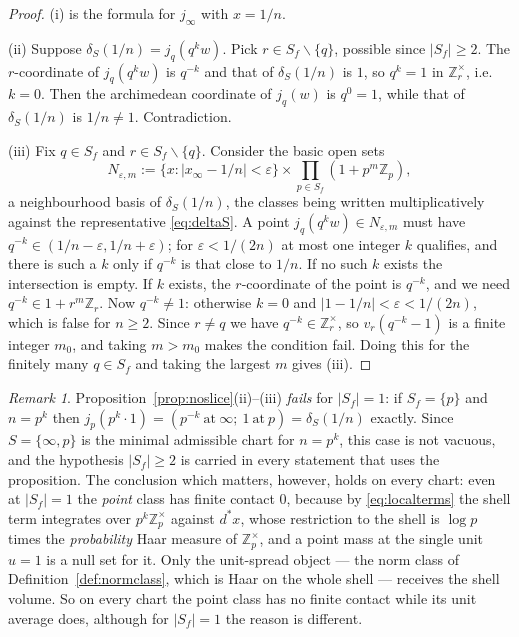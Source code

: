 \documentclass[11pt]{amsart}
\theoremstyle{definition}
\theoremstyle{remark}
\newtheorem{remark}[theorem]{Remark}
\newcommand{\Z}{\mathbb Z}
\begin{document}
\begin{proof}
(i) is the formula for $j_\infty$ with $x=1/n$.

(ii) Suppose $\delta_S(1/n)=j_q(q^kw)$. Pick $r\in S_f\smallsetminus\{q\}$,
possible since $|S_f|\ge2$. The $r$-coordinate of $j_q(q^kw)$ is $q^{-k}$ and
that of $\delta_S(1/n)$ is $1$, so $q^{k}=1$ in $\Z_r^\times$, i.e. $k=0$.
Then the archimedean coordinate of $j_q(w)$ is $q^0=1$, while that of
$\delta_S(1/n)$ is $1/n\ne1$. Contradiction.

(iii) Fix $q\in S_f$ and $r\in S_f\smallsetminus\{q\}$. Consider the basic
open sets
\[
  N_{\varepsilon,m}:=\{x:|x_\infty-1/n|<\varepsilon\}\times
     \prod_{p\in S_f}(1+p^m\Z_p),
\]
a neighbourhood basis of $\delta_S(1/n)$, the classes being written
multiplicatively against the representative \eqref{eq:deltaS}. A point
$j_q(q^kw)\in N_{\varepsilon,m}$ must have
$q^{-k}\in(1/n-\varepsilon,1/n+\varepsilon)$; for $\varepsilon<1/(2n)$ at most
one integer $k$ qualifies, and there is such a $k$ only if $q^{-k}$ is that
close to $1/n$. If no such $k$ exists the intersection is empty. If $k$
exists, the $r$-coordinate of the point is $q^{-k}$, and we need
$q^{-k}\in1+r^m\Z_r$. Now $q^{-k}\ne1$: otherwise $k=0$ and
$|1-1/n|<\varepsilon<1/(2n)$, which is false for $n\ge2$. Since $r\ne q$ we
have $q^{-k}\in\Z_r^\times$, so $v_r(q^{-k}-1)$ is a finite integer $m_0$, and
taking $m>m_0$ makes the condition fail. Doing this for the finitely many
$q\in S_f$ and taking the largest $m$ gives (iii).
\end{proof}

\begin{remark}\label{rem:minimalchart}
Proposition~\ref{prop:noslice}(ii)--(iii) \emph{fails} for $|S_f|=1$: if
$S_f=\{p\}$ and $n=p^k$ then $j_p(p^k\cdot1)=(p^{-k}\ \text{at}\ \infty;\
1\ \text{at}\ p)=\delta_S(1/n)$ exactly. Since $S=\{\infty,p\}$ is the minimal
admissible chart for $n=p^k$, this case is not vacuous, and the hypothesis
$|S_f|\ge2$ is carried in every statement that uses the proposition. The
conclusion which matters, however, holds on every chart: even at $|S_f|=1$ the
\emph{point} class has finite contact $0$, because by \eqref{eq:localterms} the
shell term integrates over $p^k\Z_p^\times$ against $d^*x$, whose restriction
to the shell is $\log p$ times the \emph{probability} Haar measure of
$\Z_p^\times$, and a point mass at the single unit $u=1$ is a null set for it.
Only the unit-spread object --- the norm class of
Definition~\ref{def:normclass}, which is Haar on the whole shell --- receives
the shell volume. So on every chart the point class has no finite contact while its unit
average does, although for $|S_f|=1$ the reason is different.
\end{remark}
\end{document}
